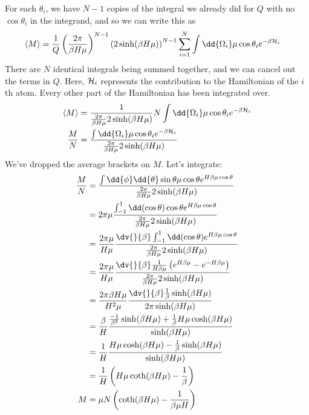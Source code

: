 \documentclass[../../PS3.tex]{subfiles}
\begin{document}
For each $\theta_i$, we have $N - 1$ copies of the integral we already did for $Q$ with no $\cos \theta_i$ in the integrand, and so we can write this as 
\begin{align}
	\left< M \right> &= \frac{1}{Q} \left( \frac{2 \pi }{\beta H \mu}\right)^{N-1} \left(2\sinh(\beta H \mu) \right)^{N-1} \sum_{i = 1}^N  \int \dd{\Omega_i} \mu \cos\theta_i  e^{-\beta\ham_i} 
\end{align}
There are $N$ identical integrals being summed together, and we can cancel out the terms in $Q$. Here, $\mathcal{H}_i$ represents the contribution to the Hamiltonian of the $i$th atom. Every other part of the Hamiltonian has been integrated over.
\begin{align}
	\left< M \right> &= \frac{1}{\frac{2 \pi }{\beta H \mu} 2\sinh(\beta H \mu) }  N \int \dd{\Omega_i} \mu \cos\theta_i  e^{-\beta\ham_i} \\
	\frac{M}{N} &= \frac{\int \dd{\Omega_i} \mu \cos\theta_i  e^{-\beta\ham_i} }{\frac{2 \pi }{\beta H \mu} 2\sinh(\beta H \mu)}
\end{align}
We've dropped the average brackets on $M$. Let's integrate:
\begin{align}
	\frac{M}{N} &= \frac{\int \dd{\phi} \dd{\theta} \sin\theta \mu \cos\theta  e^{H \beta \mu \cos\theta}}{\frac{2 \pi }{\beta H \mu} 2\sinh(\beta H \mu)} \\
	&= 2 \pi \mu \frac{\int_{-1}^{1} \dd(\cos\theta) \cos\theta  e^{H \beta \mu \cos\theta}}{\frac{2 \pi }{\beta H \mu} 2\sinh(\beta H \mu)} \\
	&= \frac{2 \pi \mu}{H \mu} \frac{\dv{}{\beta} \int_{-1}^{1} \dd(\cos\theta)  e^{H \beta \mu \cos\theta}}{\frac{2 \pi }{\beta H \mu} 2\sinh(\beta H \mu)} \\
	&= \frac{2 \pi \mu}{H \mu} \frac{\dv{}{\beta} \frac{1}{H \beta \mu} \left(e^{H \beta \mu } - e^{-H \beta \mu} \right)}{\frac{2 \pi }{\beta H \mu} 2\sinh(\beta H \mu)} \\
	&= \frac{2 \pi \beta H \mu}{H^2 \mu} \frac{\dv{}{\beta} \frac{1}{\beta } \sinh(\beta H \mu)}{2 \pi \sinh(\beta H \mu)} \\
	&= \frac{\beta }{H} \frac{ \frac{-1}{\beta ^2} \sinh(\beta H \mu) + \frac{1}{\beta} H \mu \cosh(\beta H \mu)}{ \sinh(\beta H \mu)} \\
	&= \frac{1}{H} \frac{ H \mu \cosh(\beta H \mu) - \frac{1}{\beta} \sinh(\beta H \mu)}{\sinh(\beta H \mu)} \\
	&= \frac{1}{H} \left(H \mu \coth(\beta H \mu) - \frac{1}{\beta} \right) \\
	M &= \mu N \left( \coth(\beta H \mu) - \frac{1}{\beta \mu H} \right)
\end{align}
\end{document}
